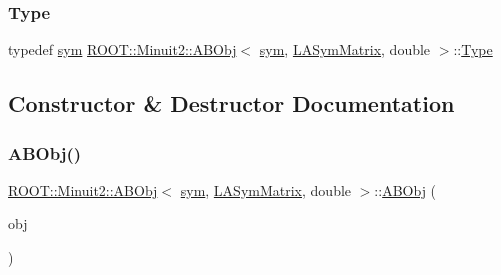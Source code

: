 \mbox{\label{classROOT_1_1Minuit2_1_1ABObj_3_01sym_00_01LASymMatrix_00_01double_01_4_ac7186d69c32b1e8a607ae45125e869c0}} 
\subsubsection{\texorpdfstring{Type}{Type}\hspace{0.1cm}{\footnotesize\ttfamily [3/3]}}
{\footnotesize\ttfamily typedef \mbox{\hyperlink{classROOT_1_1Minuit2_1_1sym}{sym}} \mbox{\hyperlink{classROOT_1_1Minuit2_1_1ABObj}{R\+O\+O\+T\+::\+Minuit2\+::\+A\+B\+Obj}}$<$ \mbox{\hyperlink{classROOT_1_1Minuit2_1_1sym}{sym}}, \mbox{\hyperlink{classROOT_1_1Minuit2_1_1LASymMatrix}{L\+A\+Sym\+Matrix}}, double $>$\+::\mbox{\hyperlink{classROOT_1_1Minuit2_1_1ABObj_3_01sym_00_01LASymMatrix_00_01double_01_4_ac7186d69c32b1e8a607ae45125e869c0}{Type}}}



\subsection{Constructor \& Destructor Documentation}
\mbox{\label{classROOT_1_1Minuit2_1_1ABObj_3_01sym_00_01LASymMatrix_00_01double_01_4_a22738586c6027ada2234556dbab7d406}} 
\subsubsection{\texorpdfstring{ABObj()}{ABObj()}\hspace{0.1cm}{\footnotesize\ttfamily [1/12]}}
{\footnotesize\ttfamily \mbox{\hyperlink{classROOT_1_1Minuit2_1_1ABObj}{R\+O\+O\+T\+::\+Minuit2\+::\+A\+B\+Obj}}$<$ \mbox{\hyperlink{classROOT_1_1Minuit2_1_1sym}{sym}}, \mbox{\hyperlink{classROOT_1_1Minuit2_1_1LASymMatrix}{L\+A\+Sym\+Matrix}}, double $>$\+::\mbox{\hyperlink{classROOT_1_1Minuit2_1_1ABObj}{A\+B\+Obj}} (\begin{DoxyParamCaption}\item[{const \mbox{\hyperlink{classROOT_1_1Minuit2_1_1LASymMatrix}{L\+A\+Sym\+Matrix}} \&}]{obj }\end{DoxyParamCaption})\hspace{0.3cm}{\ttfamily [inline]}}

